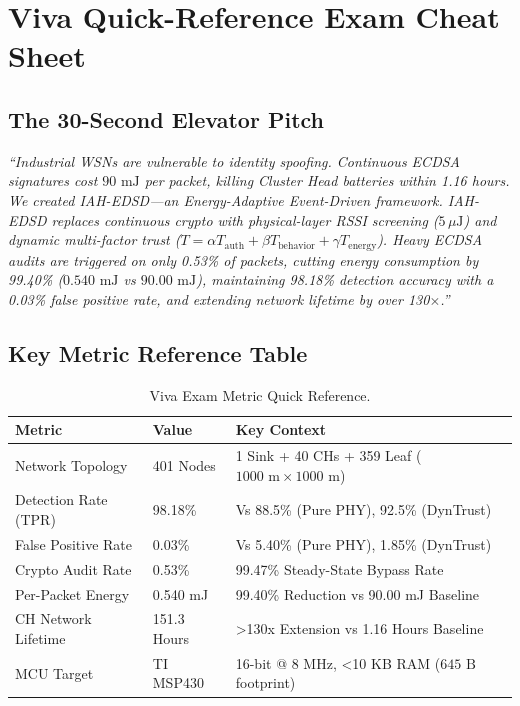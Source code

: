 \documentclass[11pt,a4paper,oneside]{book}
\begin{document}
\chapter{Viva Quick-Reference Exam Cheat Sheet}

\section{The 30-Second Elevator Pitch}
\textit{``Industrial WSNs are vulnerable to identity spoofing. Continuous ECDSA signatures cost $90\text{ mJ}$ per packet, killing Cluster Head batteries within 1.16 hours. We created IAH-EDSD—an Energy-Adaptive Event-Driven framework. IAH-EDSD replaces continuous crypto with physical-layer RSSI screening ($5\,\mu\text{J}$) and dynamic multi-factor trust ($T = \alpha T_{\text{auth}} + \beta T_{\text{behavior}} + \gamma T_{\text{energy}}$). Heavy ECDSA audits are triggered on only 0.53\% of packets, cutting energy consumption by 99.40\% ($0.540\text{ mJ}$ vs $90.00\text{ mJ}$), maintaining 98.18\% detection accuracy with a 0.03\% false positive rate, and extending network lifetime by over 130$\times$.''}

\section{Key Metric Reference Table}
\begin{table}[htbp]
\centering
\small
\caption{Viva Exam Metric Quick Reference.}
\begin{tabular}{|l|l|l|}
\hline
\textbf{Metric} & \textbf{Value} & \textbf{Key Context} \\ \hline
Network Topology & 401 Nodes & 1 Sink + 40 CHs + 359 Leaf ($1000\text{ m} \times 1000\text{ m}$) \\ \hline
Detection Rate (TPR) & 98.18\% & Vs 88.5\% (Pure PHY), 92.5\% (DynTrust) \\ \hline
False Positive Rate & 0.03\% & Vs 5.40\% (Pure PHY), 1.85\% (DynTrust) \\ \hline
Crypto Audit Rate & 0.53\% & 99.47\% Steady-State Bypass Rate \\ \hline
Per-Packet Energy & 0.540 mJ & 99.40\% Reduction vs 90.00 mJ Baseline \\ \hline
CH Network Lifetime & 151.3 Hours & >130x Extension vs 1.16 Hours Baseline \\ \hline
MCU Target & TI MSP430 & 16-bit @ 8 MHz, <10 KB RAM ($645\text{ B}$ footprint) \\ \hline
\end{tabular}
\end{table}
\end{document}
